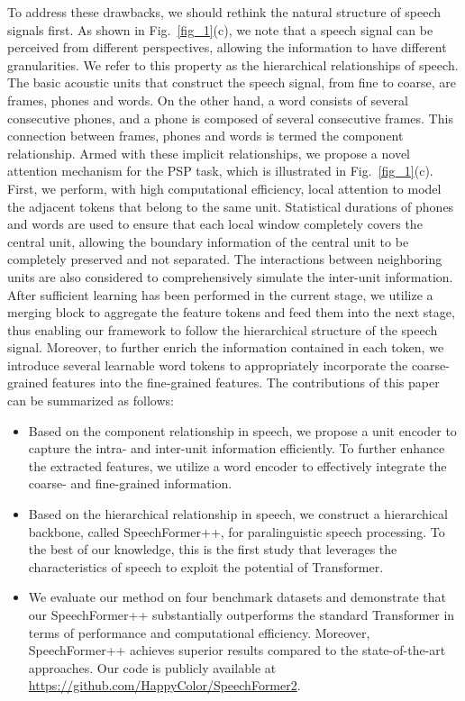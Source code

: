 \documentclass[lettersize,journal]{IEEEtran}
\begin{document}
To address these drawbacks, we should rethink the natural structure of speech signals first. As shown in Fig.~\ref{fig_1}(c), we note that a speech signal can be perceived from different perspectives, allowing the information to have different granularities. We refer to this property as the hierarchical relationships of speech. The basic acoustic units that construct the speech signal, from fine to coarse, are frames, phones and words. On the other hand, a word consists of several consecutive phones, and a phone is composed of several consecutive frames. This connection between frames, phones and words is termed the component relationship. Armed with these implicit relationships, we propose a novel attention mechanism for the PSP task, which is illustrated in Fig.~\ref{fig_1}(c). First, we perform, with high computational efficiency, local attention to model the adjacent tokens that belong to the same unit. Statistical durations of phones and words are used to ensure that each local window completely covers the central unit, allowing the boundary information of the central unit to be completely preserved and not separated. The interactions between neighboring units are also considered to comprehensively simulate the inter-unit information. After sufficient learning has been performed in the current stage, we utilize a merging block to aggregate the feature tokens and feed them into the next stage, thus enabling our framework to follow the hierarchical structure of the speech signal. Moreover, to further enrich the information contained in each token, we introduce several learnable word tokens to appropriately incorporate the coarse-grained features into the fine-grained features. The contributions of this paper can be summarized as follows:

\begin{itemize}
\item Based on the component relationship in speech, we propose a unit encoder to capture the intra- and inter-unit information efficiently. To further enhance the extracted features, we utilize a word encoder to effectively integrate the coarse- and fine-grained information.

\item Based on the hierarchical relationship in speech, we construct a hierarchical backbone, called SpeechFormer++, for paralinguistic speech processing. To the best of our knowledge, this is the first study that leverages the characteristics of speech to exploit the potential of Transformer.

\item We evaluate our method on four  benchmark datasets and demonstrate that our SpeechFormer++ substantially outperforms the standard Transformer in terms of performance and computational efficiency. Moreover, SpeechFormer++ achieves superior results compared to the state-of-the-art approaches. Our code is publicly available at \url{https://github.com/HappyColor/SpeechFormer2}.

\end{itemize}
\end{document}
